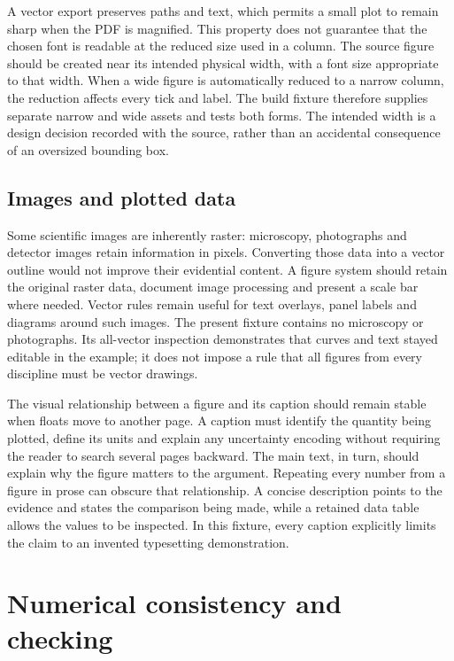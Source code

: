 A vector export preserves paths and text, which permits a small plot to remain sharp when the PDF is magnified. This property does not guarantee that the chosen font is readable at the reduced size used in a column. The source figure should be created near its intended physical width, with a font size appropriate to that width. When a wide figure is automatically reduced to a narrow column, the reduction affects every tick and label. The build fixture therefore supplies separate narrow and wide assets and tests both forms. The intended width is a design decision recorded with the source, rather than an accidental consequence of an oversized bounding box.

\subsection{Images and plotted data}
Some scientific images are inherently raster: microscopy, photographs and detector images retain information in pixels. Converting those data into a vector outline would not improve their evidential content. A figure system should retain the original raster data, document image processing and present a scale bar where needed. Vector rules remain useful for text overlays, panel labels and diagrams around such images. The present fixture contains no microscopy or photographs. Its all-vector inspection demonstrates that curves and text stayed editable in the example; it does not impose a rule that all figures from every discipline must be vector drawings.

The visual relationship between a figure and its caption should remain stable when floats move to another page. A caption must identify the quantity being plotted, define its units and explain any uncertainty encoding without requiring the reader to search several pages backward. The main text, in turn, should explain why the figure matters to the argument. Repeating every number from a figure in prose can obscure that relationship. A concise description points to the evidence and states the comparison being made, while a retained data table allows the values to be inspected. In this fixture, every caption explicitly limits the claim to an invented typesetting demonstration.

\section{Numerical consistency and checking}
